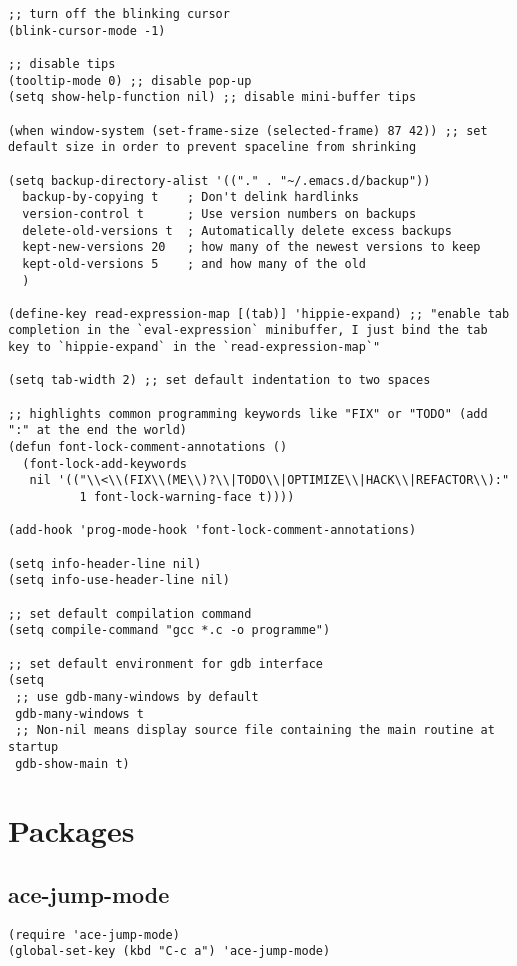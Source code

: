 \documentclass[11pt]{article}
\begin{document}
\begin{verbatim}
;; turn off the blinking cursor
(blink-cursor-mode -1)

;; disable tips
(tooltip-mode 0) ;; disable pop-up
(setq show-help-function nil) ;; disable mini-buffer tips

(when window-system (set-frame-size (selected-frame) 87 42)) ;; set default size in order to prevent spaceline from shrinking

(setq backup-directory-alist '(("." . "~/.emacs.d/backup"))
  backup-by-copying t    ; Don't delink hardlinks
  version-control t      ; Use version numbers on backups
  delete-old-versions t  ; Automatically delete excess backups
  kept-new-versions 20   ; how many of the newest versions to keep
  kept-old-versions 5    ; and how many of the old
  )

(define-key read-expression-map [(tab)] 'hippie-expand) ;; "enable tab completion in the `eval-expression` minibuffer, I just bind the tab key to `hippie-expand` in the `read-expression-map`"

(setq tab-width 2) ;; set default indentation to two spaces

;; highlights common programming keywords like "FIX" or "TODO" (add ":" at the end the world)
(defun font-lock-comment-annotations ()
  (font-lock-add-keywords
   nil '(("\\<\\(FIX\\(ME\\)?\\|TODO\\|OPTIMIZE\\|HACK\\|REFACTOR\\):"
          1 font-lock-warning-face t))))

(add-hook 'prog-mode-hook 'font-lock-comment-annotations)

(setq info-header-line nil)
(setq info-use-header-line nil) 

;; set default compilation command
(setq compile-command "gcc *.c -o programme")

;; set default environment for gdb interface
(setq
 ;; use gdb-many-windows by default
 gdb-many-windows t
 ;; Non-nil means display source file containing the main routine at startup
 gdb-show-main t)
\end{verbatim}
\section{Packages}
\label{sec-2}
\subsection{ace-jump-mode}
\label{sec-2-1}
\begin{verbatim}
(require 'ace-jump-mode)
(global-set-key (kbd "C-c a") 'ace-jump-mode)
\end{verbatim}
\end{document}
